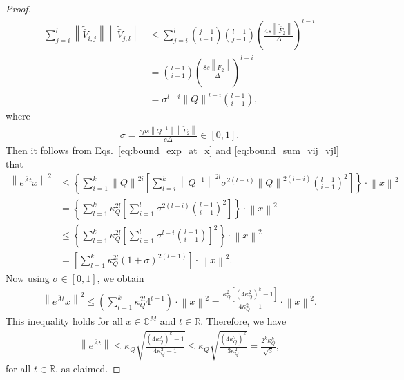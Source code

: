 \documentclass[superscriptaddress,onecolumn,nofootinbib,longbibliography,a4paper,accepted=2026-09-29]{quantumarticle}
\theoremstyle{plain}
\theoremstyle{definition}
\numberwithin{thm}{section}
\numberwithin{assumption}{section}
\numberwithin{lemma}{section}
\numberwithin{prop}{section}
\numberwithin{cor}{section}
\numberwithin{definition}{section}
\numberwithin{rmk}{section}
\numberwithin{equation}{section}
\newcommand{\norm}[1]     {\left\| #1 \right\|}
\newcommand{\R}{\mathbb{R}}
\newcommand{\myC}{\mathbb{C}}
\newcommand{\lrb}[1]{\left ( #1 \right )}
\newcommand{\lrsb}[1]{\left [ #1 \right ]}
\newcommand{\lrcb}[1]{\left \{ #1 \right \}}
\begin{document}
\begin{proof}
\begin{align}
    \sum_{j=i}^{l} \norm{\tilde{\bar{V}}_{i,j}}  \norm{\tilde{\bar{V}}_{j,l}}
    &\le \sum_{j=i}^{l} \binom{j-1}{i-1} \binom{l-1}{j-1} \lrb{\frac{4s \norm{\tilde{\bar{F}}_2}}{\Delta}}^{l-i} \\
    &=\binom{l-1}{i-1}\lrb{\frac{8s \norm{\tilde{\bar{F}}_2}}{\Delta}}^{l-i} \\
    &=
    \sigma^{l-i} \norm{Q}^{l-i}  \binom{l-1}{i-1},
    \label{eq:bound_sum_vij_vjl}
\end{align}
where
\begin{align}
    \sigma = \frac{8\rho  s \norm{Q^{-1}} \norm{\tilde{F}_2}}{c\Delta} \in [0, 1].
\end{align}
Then it follows from Eqs.~\eqref{eq:bound_exp_at_x} and \eqref{eq:bound_sum_vij_vjl} that
\begin{align}
    \norm{e^{\bar{A}t} x}^2 
    &\le \lrcb{\sum_{i=1}^k \norm{Q}^{2i} \lrsb{\sum_{l=i}^k \norm{Q^{-1}}^{2l} \sigma^{2(l-i)} \norm{Q}^{2(l-i)} \binom{l-1}{i-1}^2}} \cdot \norm{x}^2 \\
    &= \lrcb{\sum_{l=1}^k \kappa_{Q}^{2l} \lrsb{\sum_{i=1}^l \sigma^{2(l-i)} \binom{l-1}{i-1}^2}} \cdot \norm{x}^2 \\
    & \le 
    \lrcb{\sum_{l=1}^k \kappa_{Q}^{2l} \lrsb{\sum_{i=1}^l \sigma^{l-i} \binom{l-1}{i-1}}^2} \cdot \norm{x}^2 \\
    &=
     \lrsb{\sum_{l=1}^k \kappa_{Q}^{2l} \lrb{1+\sigma}^{2(l-1)}} \cdot \norm{x}^2.
\end{align}
Now using $\sigma \in [0, 1]$, we obtain
\begin{align}
    \norm{e^{\bar{A}t} x}^2 
    \le
     \lrb{\sum_{l=1}^k \kappa_{Q}^{2l} 4^{l-1}} \cdot \norm{x}^2
    = \frac{\kappa_Q^2\lrsb{(4\kappa_Q^2)^k-1}}{4\kappa_Q^2-1}
    \cdot \norm{x}^2.
\end{align}
This inequality holds for all $x \in \myC^M$ and $t \in \R$. Therefore, we have 
\begin{align}
\norm{e^{\bar{A}t}} \le  \kappa_Q \sqrt{\frac{(4\kappa_Q^2)^k-1}{4\kappa_Q^2-1}}
\le \kappa_Q \sqrt{\frac{(4\kappa_Q^2)^k}{3\kappa_Q^2}}
=\frac{2^k \kappa_Q^{k}}{\sqrt{3}}, 
\end{align}
for all $t \in \R$, as claimed. 
\end{proof}
\end{document}
